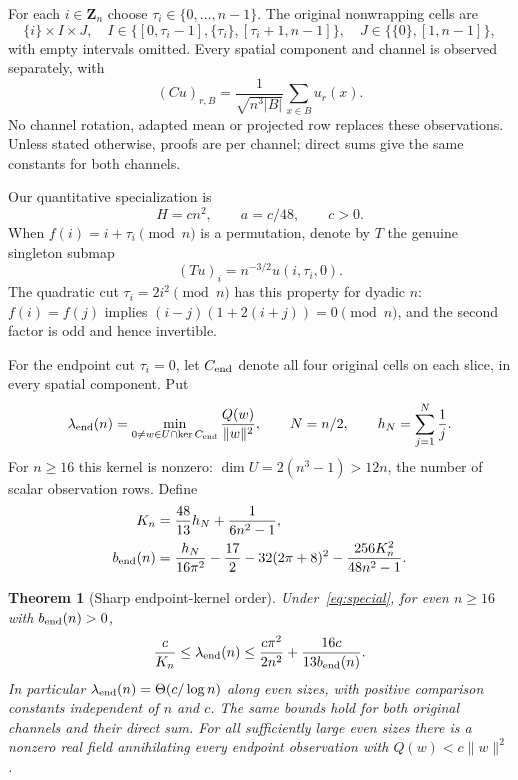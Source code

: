 \documentclass[11pt]{article}
\newcommand{\Z}{\mathbf Z}
\newcommand{\norm}[1]{\lVert#1\rVert}
\newtheorem{theorem}{Theorem}[section]
\theoremstyle{definition}
\theoremstyle{remark}
\begin{document}
For each $i\in\Z_n$ choose $\tau_i\in\{0,\ldots,n-1\}$. The original
nonwrapping cells are
\[
 \{i\}\times I\times J,\quad
 I\in\{[0,\tau_i-1],\{\tau_i\},[\tau_i+1,n-1]\},\quad
 J\in\{\{0\},[1,n-1]\},
\]
with empty intervals omitted. Every spatial component and channel is
observed separately, with
\begin{equation}\label{eq:C}
 (Cu)_{r,B}=\frac{1}{\sqrt{n^3|B|}}\sum_{x\in B}u_r(x).
\end{equation}
No channel rotation, adapted mean or projected row replaces these observations.
Unless stated otherwise, proofs are per channel; direct sums give the same
constants for both channels.

Our quantitative specialization is
\begin{equation}\label{eq:special}
             H=cn^2,\qquad a=c/48,\qquad c>0.
\end{equation}
When $f(i)=i+\tau_i\pmod n$ is a permutation, denote by $T$ the genuine
singleton submap
\begin{equation}\label{eq:T}
             (Tu)_i=n^{-3/2}u(i,\tau_i,0).
\end{equation}
The quadratic cut $\tau_i=2i^2\pmod n$ has this property for dyadic $n$:
$f(i)=f(j)$ implies $(i-j)(1+2(i+j))=0\pmod n$, and the second factor is
odd and hence invertible.

For the endpoint cut $\tau_i=0$, let $C_{\rm end}$ denote all four
original cells on each slice, in every spatial component. Put
\[
 \lambda_{\rm end}(n)=\min_{0\ne w\in U\cap\ker C_{\rm end}}
                              \frac{Q(w)}{\norm w^2},
 \qquad N=n/2,\qquad h_N=\sum_{j=1}^N\frac1j.
\]
For $n\ge16$ this kernel is nonzero: $\dim U=2(n^3-1)>12n$, the
number of scalar observation rows. Define
\begin{align}\label{eq:mainconstants}
 K_n&=\frac{48}{13}h_N+\frac1{6n^2-1},\\
 b_{\rm end}(n)&=\frac{h_N}{16\pi^2}-\frac{17}2
       -32(2\pi+8)^2-\frac{256K_n^2}{48n^2-1}.\notag
\end{align}

\begin{theorem}[Sharp endpoint-kernel order]\label{thm:endpoint}
Under~\eqref{eq:special}, for even $n\ge16$ with $b_{\rm end}(n)>0$,
\begin{equation}\label{eq:endpointsandwich}
 \frac c{K_n}\le\lambda_{\rm end}(n)
 \le\frac{c\pi^2}{2n^2}+\frac{16c}{13b_{\rm end}(n)}.
\end{equation}
In particular $\lambda_{\rm end}(n)=\Theta(c/\log n)$ along even sizes,
with positive comparison constants independent of $n$ and $c$.
The same bounds hold for both original channels and their direct sum.
For all sufficiently large even sizes there is a nonzero real field
annihilating every endpoint observation with $Q(w)<c\norm w^2$.
\end{theorem}
\end{document}
